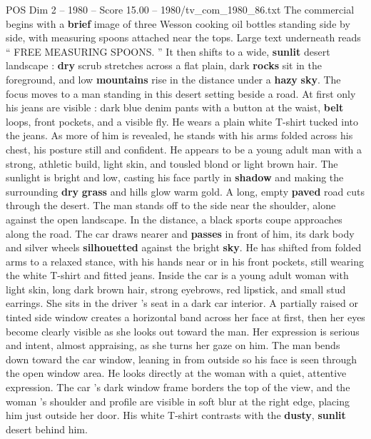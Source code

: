 \begin{textsample}{POS Dim 2 – 1980 – Score 15.00 – 1980/tv\_com\_1980\_86.txt}  \label{ex:f2_pos_068}
The commercial begins with a \textbf{brief} image of three Wesson cooking oil bottles standing side by side, with measuring spoons attached near the tops.
Large text underneath reads “ FREE MEASURING SPOONS. ” It then shifts to a wide, \textbf{sunlit} desert landscape : \textbf{dry} scrub stretches across a flat plain, dark \textbf{rocks} sit in the foreground, and low \textbf{mountains} rise in the distance under a \textbf{hazy} \textbf{sky}.
The focus moves to a man standing in this desert setting beside a road.
At first only his jeans are visible : dark blue denim pants with a button at the waist, \textbf{belt} loops, front pockets, and a visible fly.
He wears a plain white T-shirt tucked into the jeans.
As more of him is revealed, he stands with his arms folded across his chest, his posture still and confident.
He appears to be a young adult man with a strong, athletic build, light skin, and tousled blond or light brown hair.
The sunlight is bright and low, casting his face partly in \textbf{shadow} and making the surrounding \textbf{dry} \textbf{grass} and hills glow warm gold.
A long, empty \textbf{paved} road cuts through the desert.
The man stands off to the side near the shoulder, alone against the open landscape.
In the distance, a black sports coupe approaches along the road.
The car draws nearer and \textbf{passes} in front of him, its dark body and silver wheels \textbf{silhouetted} against the bright \textbf{sky}.
He has shifted from folded arms to a relaxed stance, with his hands near or in his front pockets, still wearing the white T-shirt and fitted jeans.
Inside the car is a young adult woman with light skin, long dark brown hair, strong eyebrows, red lipstick, and small stud earrings.
She sits in the driver ’s seat in a dark car interior.
A partially raised or tinted side window creates a horizontal band across her face at first, then her eyes become clearly visible as she looks out toward the man.
Her expression is serious and intent, almost appraising, as she turns her gaze on him.
The man bends down toward the car window, leaning in from outside so his face is seen through the open window area.
He looks directly at the woman with a quiet, attentive expression.
The car ’s dark window frame borders the top of the view, and the woman ’s shoulder and profile are visible in soft blur at the right edge, placing him just outside her door.
His white T-shirt contrasts with the \textbf{dusty}, \textbf{sunlit} desert behind him.

\end{textsample}
